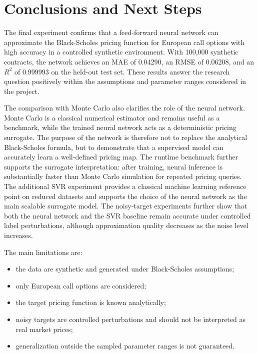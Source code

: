\chapter{Conclusions and Next Steps}

The final experiment confirms that a feed-forward neural network can approximate the Black-Scholes pricing function for European call options with high accuracy in a controlled synthetic environment.
With 100,000 synthetic contracts, the network achieves an MAE of 0.04290, an RMSE of 0.06208, and an $R^2$ of 0.999993 on the held-out test set.
These results answer the research question positively within the assumptions and parameter ranges considered in the project.

The comparison with Monte Carlo also clarifies the role of the neural network.
Monte Carlo is a classical numerical estimator and remains useful as a benchmark, while the trained neural network acts as a deterministic pricing surrogate.
The purpose of the network is therefore not to replace the analytical Black-Scholes formula, but to demonstrate that a supervised model can accurately learn a well-defined pricing map.
The runtime benchmark further supports the surrogate interpretation: after training, neural inference is substantially faster than Monte Carlo simulation for repeated pricing queries.
The additional SVR experiment provides a classical machine learning reference point on reduced datasets and supports the choice of the neural network as the main scalable surrogate model.
The noisy-target experiments further show that both the neural network and the SVR baseline remain accurate under controlled label perturbations, although approximation quality decreases as the noise level increases.

The main limitations are:

\begin{itemize}
    \item the data are synthetic and generated under Black-Scholes assumptions;
    \item only European call options are considered;
    \item the target pricing function is known analytically;
    \item noisy targets are controlled perturbations and should not be interpreted as real market prices;
    \item generalization outside the sampled parameter ranges is not guaranteed.
\end{itemize}

